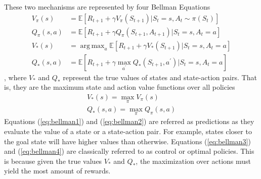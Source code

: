 \documentclass[12pt]{report}
\DeclareMathOperator*{\argmax}{arg\,max}
\begin{document}
These two mechanisms are represented by four Bellman Equations \cite{sutton2018reinforcement} \cite{sutton1999between}
\begin{align}
    V_\pi(s)&=\mathbb{E}[R_{t+1}+\gamma V_\pi(S_{t+1})|S_t=s, A_t\sim \pi(S_t)] \label{eq:bellman1}\\
    Q_\pi(s,a)&=\mathbb{E}[R_{t+1}+\gamma Q_\pi(S_{t+1},A_{t+1})|S_t=s, A_t=a]\label{eq:bellman2}\\
    V_*(s)&=\argmax_a \mathbb{E}[R_{t+1}+\gamma V_*(S_{t+1})|S_t=s, A_t=a]\label{eq:bellman3}\\
    Q_*(s,a)&=\mathbb{E}[R_{t+1}+\gamma \max_{a^\prime} Q_*(S_{t+1},a^\prime)|S_t=s, A_t=a]\label{eq:bellman4}
\end{align}
, where $V_*$ and $Q_*$ represent the true values of states and state-action pairs. That is, they are the maximum state and action value functions over all policies
\begin{align}
    V_*(s) = \max_\pi V_\pi(s)\\
    Q_*(s,a) = \max_\pi Q_\pi(s,a)
\end{align}
Equations (\ref{eq:bellman1}) and (\ref{eq:bellman2}) are referred as predictions as they evaluate the value of a state or a state-action pair. For example, states closer to the goal state will have higher values than otherwise. Equations (\ref{eq:bellman3}) and (\ref{eq:bellman4}) are classically referred to as control or optimal policies. This is because given the true values $V_*$ and $Q_*$, the maximization over actions must yield the most amount of rewards.\\

\end{document}
